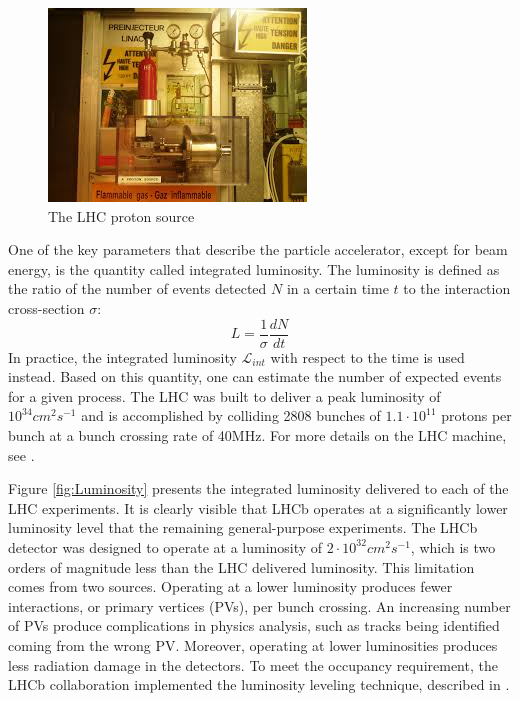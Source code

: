 \begin{figure}
\centering
\includegraphics[scale=0.6]{figures/Bottle.jpg}
\caption{The LHC proton source 
\label{fig:Bottle}}
\end{figure}

One of the key parameters that describe the particle accelerator, except for beam energy, is the quantity called integrated luminosity.  The luminosity is defined as  the ratio of the  number of events detected $N$ in a certain time $t$ to the interaction cross-section $\sigma$:  
\begin{equation}
    L = \frac{1}{\sigma} \frac{dN}{dt}
\end{equation}
In practice, the integrated luminosity $\mathcal{L}_{int}$ with respect to the time is used instead. Based on this quantity, one can estimate the number of expected events for a given process.  
The LHC was built to deliver a peak luminosity of $10^{34} cm^2s^{-1}$ and is accomplished by colliding 2808 bunches of $1.1 \cdot 10^{11}$ protons per bunch at a bunch crossing rate of 40MHz.  For more details on the LHC machine, see \cite{LHC_machine}.

Figure \ref{fig:Luminosity} presents the integrated luminosity delivered to each of the LHC experiments. It is clearly visible that LHCb operates at a significantly lower luminosity level that the remaining general-purpose experiments.  The LHCb detector was designed to operate at a luminosity of $2 \cdot 10^{32}cm^2s^{-1}$, which is two orders of magnitude less than the LHC delivered luminosity.  This limitation comes from two sources. Operating at a lower luminosity produces fewer interactions, or primary vertices (PVs), per bunch crossing. An increasing number of PVs produce complications in physics analysis, such as tracks being identified coming from the wrong PV.  Moreover, operating at lower luminosities produces less radiation damage in the detectors. To meet the occupancy requirement, the LHCb collaboration implemented the luminosity leveling technique, described in \cite{lumi_down}. 


